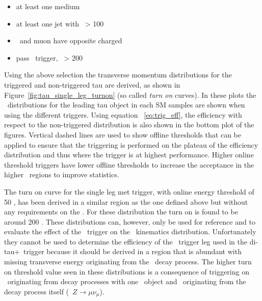 	\begin{itemize}
	\item at least one medium \ltau\
	\item at least one jet with \pt\ > 100 \gev\
	\item \ltau\ and muon have opposite charged 
	\item pass \met\ trigger, \met\ > 200 \gev\
	\end{itemize}
	Using the above selection the transverse momentum distributions for the triggered and non-triggered tau are derived, as shown in Figure~\ref{fig:tau_single_leg_turnon} (so called \textit{turn on} curves).
	In these plots the \pt\ distributions for the leading tau object in each \ac{SM} samples are shown when using the different triggers. 
	Using equation ~\ref{eq:trig_eff}, the efficiency with respect to the non-triggered distribution is also shown in the bottom plot of the figures. 
	Vertical dashed lines are used to show offline thresholds that can be applied to ensure that the triggering is performed on the plateau of the efficiency distribution and thus where the trigger is at highest performance. 
	Higher online threshold triggers have lower offline thresholds to increase the acceptance in the higher \pt\ regions to improve statistics. 
	\singleTauTrigTurnOn
	
	The turn on curve for the single leg met trigger, with online energy threshold of 50 \gev, has been derived in a similar region as the one defined above but without any requirements on the \met.
	 For these distribution the turn on is found to be around 200 \gev.  
	These distributions can, however, only be used for reference and to evaluate the effect of the \met\ trigger on the \met\ kinematics distribution.
	Unfortunately they cannot be used to determine the efficiency of the \met\ trigger leg used in the di-tau+\met\ trigger because it should be derived in a region that is abundant with missing transverse energy originating from the \ltau\ decay process.
	The higher turn on threshold value seen in these distributions is a consequence of triggering on \met\ originating from decay processes with one \ftau\ object and \met\ originating from the decay process itself (\eg\ $Z\rightarrow\mu\nu_{\mu}$). 
	 \metTrigTurnOn
	 
